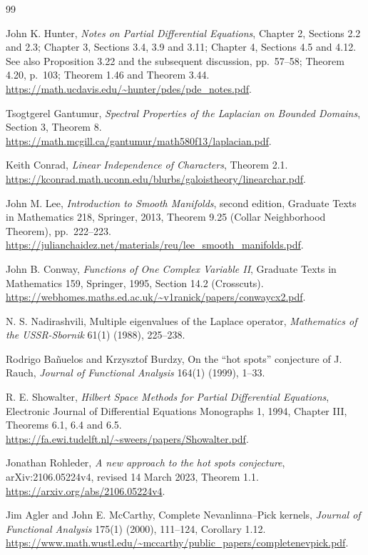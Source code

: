 \begingroup
\small
\begin{thebibliography}{99}

John K. Hunter, \emph{Notes on Partial Differential Equations},
Chapter 2, Sections 2.2 and 2.3; Chapter 3, Sections 3.4, 3.9 and 3.11;
Chapter 4, Sections 4.5 and 4.12. See also Proposition 3.22 and the
subsequent discussion, pp.~57--58; Theorem 4.20, p.~103;
Theorem 1.46 and Theorem 3.44.
\url{https://math.ucdavis.edu/~hunter/pdes/pde_notes.pdf}.

Tsogtgerel Gantumur, \emph{Spectral Properties of the Laplacian on Bounded
Domains}, Section 3, Theorem 8.
\url{https://math.mcgill.ca/gantumur/math580f13/laplacian.pdf}.

Keith Conrad, \emph{Linear Independence of Characters}, Theorem 2.1.
\url{https://kconrad.math.uconn.edu/blurbs/galoistheory/linearchar.pdf}.

John M. Lee, \emph{Introduction to Smooth Manifolds}, second edition,
Graduate Texts in Mathematics 218, Springer, 2013,
Theorem 9.25 (Collar Neighborhood Theorem), pp.~222--223.
\url{https://julianchaidez.net/materials/reu/lee_smooth_manifolds.pdf}.

John B. Conway, \emph{Functions of One Complex Variable II},
Graduate Texts in Mathematics 159, Springer, 1995,
Section 14.2 (Crosscuts).
\url{https://webhomes.maths.ed.ac.uk/~v1ranick/papers/conwaycx2.pdf}.

N. S. Nadirashvili, Multiple eigenvalues of the Laplace operator,
\emph{Mathematics of the USSR-Sbornik} 61(1) (1988), 225--238.

Rodrigo Ba\~nuelos and Krzysztof Burdzy, On the ``hot spots'' conjecture
of J. Rauch, \emph{Journal of Functional Analysis} 164(1) (1999), 1--33.

R. E. Showalter, \emph{Hilbert Space Methods for Partial Differential
Equations}, Electronic Journal of Differential Equations Monographs 1,
1994, Chapter III, Theorems 6.1, 6.4 and 6.5.
\url{https://fa.ewi.tudelft.nl/~sweers/papers/Showalter.pdf}.

Jonathan Rohleder, \emph{A new approach to the hot spots conjecture},\hfill\break
arXiv:2106.05224v4, revised 14 March 2023, Theorem 1.1.
\url{https://arxiv.org/abs/2106.05224v4}.

Jim Agler and John E. McCarthy, Complete Nevanlinna--Pick kernels,
\emph{Journal of Functional Analysis} 175(1) (2000), 111--124,
Corollary 1.12.
\url{https://www.math.wustl.edu/~mccarthy/public_papers/completenevpick.pdf}.


\end{thebibliography}
